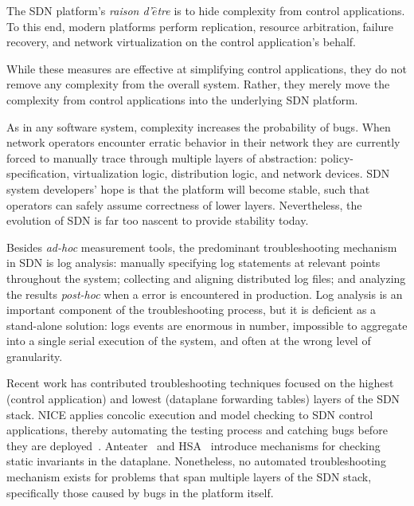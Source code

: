 The SDN platform's {\it raison d'$\hat{e}$tre} is to
hide complexity from control applications. To this end, modern platforms perform
replication, resource arbitration, failure recovery, and network
virtualization on the control application's behalf.

While these measures are effective at simplifying control applications,
they do not remove any complexity from the overall system. Rather, they merely move the complexity
from control applications into the underlying SDN platform.

As in any software system, complexity increases the probability of
bugs. When network operators encounter erratic behavior in their network
they are currently forced to manually trace through
multiple layers of abstraction: policy-specification, virtualization logic, distribution logic, and
network devices. SDN system
developers' hope is that the platform will become stable, such that
operators can safely assume correctness of lower layers.
Nevertheless, the evolution of SDN is far too nascent to provide stability
today.

Besides {\it ad-hoc} measurement tools,
the predominant troubleshooting mechanism in SDN is
log analysis: manually specifying log statements at relevant points throughout the system;
collecting and aligning distributed log files; and analyzing the
results {\it post-hoc} when a error is encountered in production. Log analysis
is an important component of the troubleshooting process, but it is deficient
as a stand-alone solution: logs events
are enormous in number, impossible to aggregate into a single serial
execution of the system, and often at the wrong level of granularity.

Recent work has contributed troubleshooting techniques focused on the highest (control
application) and lowest (dataplane forwarding tables) layers of the SDN stack.
NICE applies concolic execution and model checking to SDN control
applications, thereby automating the testing process and catching bugs before
they are deployed~\cite{nice}. Anteater~\cite{anteater} and HSA~\cite{hsa}
introduce mechanisms for checking static invariants in the dataplane.
Nonetheless, no automated troubleshooting mechanism exists for problems that span
multiple layers of the SDN stack, specifically those caused by bugs in the platform
itself.


